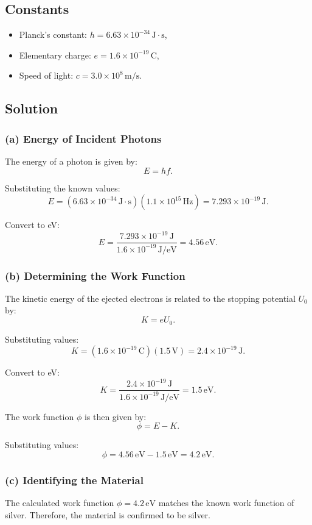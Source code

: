 \documentclass[a4paper,12pt]{article}
\begin{document}
\begin{multicols}{2}
\subsection*{Constants}
\begin{itemize}
    \item Planck's constant: $h = 6.63 \times 10^{-34} \, \mathrm{J \cdot s}$,
    \item Elementary charge: $e = 1.6 \times 10^{-19} \, \mathrm{C}$,
    \item Speed of light: $c = 3.0 \times 10^8 \, \mathrm{m/s}$.
\end{itemize}

\subsection*{Solution}
\subsubsection*{(a) Energy of Incident Photons}
The energy of a photon is given by:
\[
E = hf.
\]

Substituting the known values:
\[
E = (6.63 \times 10^{-34} \, \mathrm{J \cdot s})(1.1 \times 10^{15} \, \mathrm{Hz}) = 7.293 \times 10^{-19} \, \mathrm{J}.
\]

Convert to eV:
\[
E = \frac{7.293 \times 10^{-19} \, \mathrm{J}}{1.6 \times 10^{-19} \, \mathrm{J/eV}} = 4.56 \, \mathrm{eV}.
\]

\subsubsection*{(b) Determining the Work Function}
The kinetic energy of the ejected electrons is related to the stopping potential $U_0$ by:
\[
K = eU_0.
\]

Substituting values:
\[
K = (1.6 \times 10^{-19} \, \mathrm{C})(1.5 \, \mathrm{V}) = 2.4 \times 10^{-19} \, \mathrm{J}.
\]

Convert to eV:
\[
K = \frac{2.4 \times 10^{-19} \, \mathrm{J}}{1.6 \times 10^{-19} \, \mathrm{J/eV}} = 1.5 \, \mathrm{eV}.
\]

The work function $\phi$ is then given by:
\[
\phi = E - K.
\]

Substituting values:
\[
\phi = 4.56 \, \mathrm{eV} - 1.5 \, \mathrm{eV} = 4.2 \, \mathrm{eV}.
\]

\subsubsection*{(c) Identifying the Material}
The calculated work function $\phi = 4.2 \, \mathrm{eV}$ matches the known work function of silver. Therefore, the material is confirmed to be silver.


\end{multicols}
\end{document}
